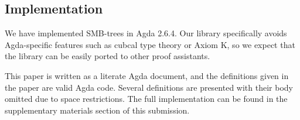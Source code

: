 
\subsection{Implementation}

We have implemented SMB-trees in Agda 2.6.4.
Our library specifically avoids Agda-specific features
such as cubcal type theory or Axiom K, so we expect
that the library can be easily ported to other proof assistants.

This paper is written as a literate Agda document, and the definitions
given in the paper are valid Agda code.
Several definitions are presented with their body omitted due to
space restrictions. The full implementation can be found in the supplementary
materials section of this submission.
